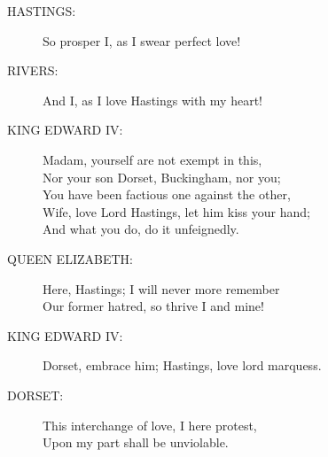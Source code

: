 \documentclass{article}
\begin{document}
\begin{description}
\item[HASTINGS:] 
\hspace{1pt}So prosper I, as I swear perfect love!\\
\end{description}
\begin{description}
\item[RIVERS:] 
\hspace{1pt}And I, as I love Hastings with my heart!\\
\end{description}
\begin{description}
\item[KING EDWARD IV:] 
\hspace{1pt}Madam, yourself are not exempt in this,\\
\hspace{1pt}Nor your son Dorset, Buckingham, nor you;\\
\hspace{1pt}You have been factious one against the other,\\
\hspace{1pt}Wife, love Lord Hastings, let him kiss your hand;\\
\hspace{1pt}And what you do, do it unfeignedly.\\
\end{description}
\begin{description}
\item[QUEEN ELIZABETH:] 
\hspace{1pt}Here, Hastings; I will never more remember\\
\hspace{1pt}Our former hatred, so thrive I and mine!\\
\end{description}
\begin{description}
\item[KING EDWARD IV:] 
\hspace{1pt}Dorset, embrace him; Hastings, love lord marquess.\\
\end{description}
\begin{description}
\item[DORSET:] 
\hspace{1pt}This interchange of love, I here protest,\\
\hspace{1pt}Upon my part shall be unviolable.\\
\end{description}
\end{document}
